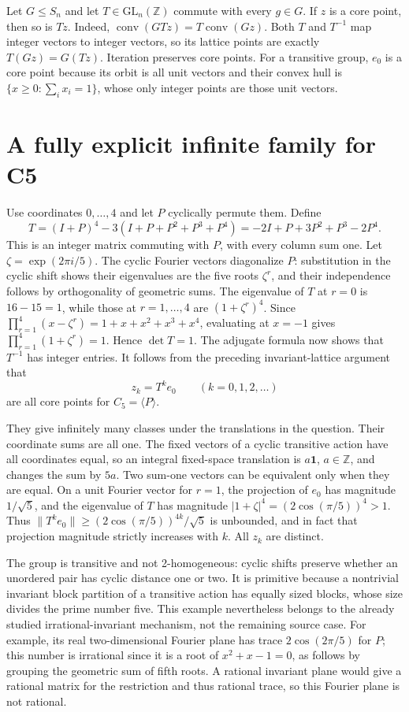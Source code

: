 \documentclass[11pt]{article}
\begin{document}
Let $G\le S_n$ and let $T\in\mathrm{GL}_n(\mathbb Z)$ commute with every
$g\in G$. If $z$ is a core point, then so is $Tz$. Indeed,
$\operatorname{conv}(GTz)=T\operatorname{conv}(Gz)$.
Both $T$ and $T^{-1}$ map integer vectors to integer vectors, so its lattice
points are exactly $T(Gz)=G(Tz)$. Iteration preserves core points.
For a transitive group, $e_0$ is a core point because its orbit is all unit
vectors and their convex hull is
$\{x\ge0:\sum_i x_i=1\}$, whose only integer points are those unit vectors.

\section{A fully explicit infinite family for C5}
Use coordinates $0,\ldots,4$ and let $P$ cyclically permute them. Define
\[
T=(I+P)^4-3(I+P+P^2+P^3+P^4)
=-2I+P+3P^2+P^3-2P^4.
\]
This is an integer matrix commuting with $P$, with every column sum one.
Let $\zeta=\exp(2\pi i/5)$. The cyclic Fourier vectors diagonalize $P$:
substitution in the cyclic shift shows their eigenvalues are the five roots
$\zeta^r$, and their independence follows by orthogonality of geometric sums.
The eigenvalue of $T$ at $r=0$ is $16-15=1$, while those at $r=1,\ldots,4$
are $(1+\zeta^r)^4$. Since
$\prod_{r=1}^4(x-\zeta^r)=1+x+x^2+x^3+x^4$, evaluating at $x=-1$ gives
$\prod_{r=1}^4(1+\zeta^r)=1$. Hence $\det T=1$.
The adjugate formula now shows that $T^{-1}$ has integer entries.
It follows from the preceding invariant-lattice argument that
\[
z_k=T^k e_0\qquad(k=0,1,2,\ldots)
\]
are all core points for $C_5=\langle P\rangle$.

They give infinitely many classes under the translations in the question.
Their coordinate sums are all one. The fixed vectors of a cyclic transitive
action have all coordinates equal, so an integral fixed-space translation
is $a\mathbf1$, $a\in\mathbb Z$, and changes the sum by $5a$.
Two sum-one vectors can be equivalent only when they are equal.
On a unit Fourier vector for $r=1$, the projection of $e_0$ has magnitude
$1/\sqrt5$, and the eigenvalue of $T$ has magnitude
$|1+\zeta|^4=(2\cos(\pi/5))^4>1$. Thus
$\|T^ke_0\|\ge(2\cos(\pi/5))^{4k}/\sqrt5$ is unbounded, and in fact
that projection magnitude strictly increases with $k$. All $z_k$ are distinct.

The group is transitive and not 2-homogeneous: cyclic shifts preserve whether
an unordered pair has cyclic distance one or two. It is primitive because a
nontrivial invariant block partition of a transitive action has equally sized
blocks, whose size divides the prime number five. This example nevertheless
belongs to the already studied irrational-invariant mechanism, not the
remaining source case. For example, its real two-dimensional Fourier plane
has trace $2\cos(2\pi/5)$ for $P$; this number is irrational since it is a
root of $x^2+x-1=0$, as follows by grouping the geometric sum of fifth roots.
A rational invariant plane would give a rational matrix for the restriction
and thus rational trace, so this Fourier plane is not rational.
\end{document}
